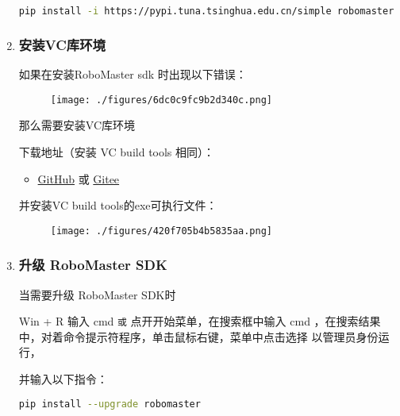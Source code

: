 \begin{enumerate}
\begin{lstlisting}[language=bash]
pip install -i https://pypi.tuna.tsinghua.edu.cn/simple robomaster
\end{lstlisting}

\item \subsubsection{安装VC库环境}
如果在安装RoboMaster sdk 时出现以下错误：
\begin{figure}[ht]
\centering
\texttt{[image: ./figures/6dc0c9fc9b2d340c.png]}
\caption{} \label{fig_PyRM1_2}
\end{figure}
那么需要安装VC库环境

下载地址（安装 VC build tools 相同）：\begin{itemize}
\item \href{https://github.com/dji-sdk/robomaster-sdk}{GitHub} 或 \href{https://gitee.com/xitinglin/RoboMaster-SDK}{Gitee}
\end{itemize}

并安装VC build tools的exe可执行文件：

\begin{figure}[ht]
\centering
\texttt{[image: ./figures/420f705b4b5835aa.png]}
\caption{} \label{fig_PyRM1_3}
\end{figure}

\item \subsubsection{升级 RoboMaster SDK}
当需要升级 RoboMaster SDK时

Win + R 输入 cmd 
\verb|或|
点开开始菜单，在搜索框中输入 cmd ，在搜索结果中，对着命令提示符程序，单击鼠标右键，菜单中点击选择 以管理员身份运行， 

并输入以下指令：

\begin{lstlisting}[language=bash]
pip install --upgrade robomaster
\end{lstlisting}

\end{enumerate}

